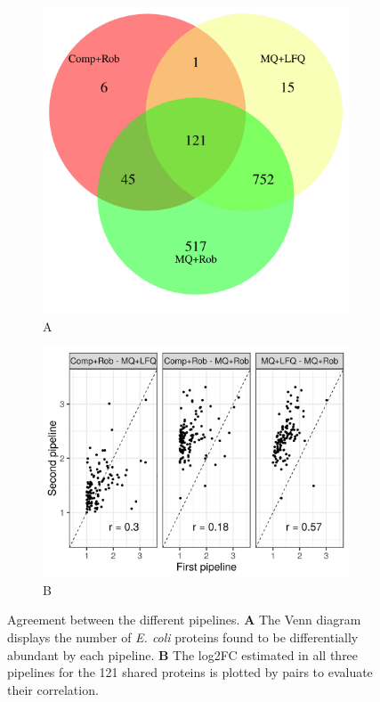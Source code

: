 \documentclass[11pt, a4paper]{report}
\begin{document}
\begin{figure}[!h]
\centering
\begin{subfigure}{.40\textwidth}
\caption*{A}
\includegraphics[width=.9\textwidth]{vennDiagram}
\end{subfigure}
\begin{subfigure}{.52\textwidth}
\caption*{B}
\includegraphics[width=.95\textwidth]{correlation_plot}
\end{subfigure}
\caption{Agreement between the different pipelines. \textbf{A} The Venn diagram displays the number of \textit{E. coli} proteins found to be differentially abundant by each pipeline. \textbf{B} The log2FC estimated in all three pipelines for the 121 shared proteins is plotted by pairs to evaluate their correlation.}
\label{fig:venn_cor}
\end{figure}
\end{document}
